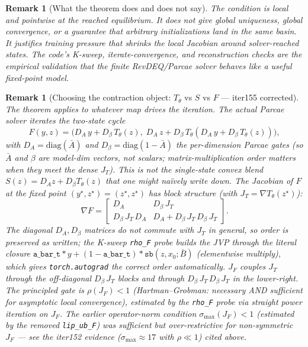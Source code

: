 \documentclass[11pt]{article}
\newtheorem{remark}[theorem]{Remark}
\begin{document}
\begin{remark}[What the theorem does and does not say]
The condition is local and pointwise at the reached equilibrium.  It does not
give global uniqueness, global convergence, or a guarantee that arbitrary
initializations land in the same basin.  It justifies training pressure that
shrinks the local Jacobian around solver-reached states.  The code's K-sweep,
iterate-convergence, and reconstruction checks are the empirical validation
that the finite RevDEQ/Parcae solver behaves like a useful fixed-point model.
\end{remark}

\begin{remark}[Choosing the contraction object: $T_\theta$ vs $S$ vs $F$ — iter155 corrected]
\label{rem:contraction-objects}
The theorem applies to whatever map drives the iteration.  The actual Parcae
solver iterates the two-state cycle
\[
  F(y, z) = \big(D_A\, y + D_\beta\, T_\theta(z),\;
                D_A\, z + D_\beta\, T_\theta(D_A\, y + D_\beta\, T_\theta(z))\big),
\]
with $D_A = \mathrm{diag}(\bar A)$ and $D_\beta = \mathrm{diag}(1-\bar A)$
the per-dimension Parcae gates (so $\bar A$ and $\beta$ are model-dim
vectors, not scalars; matrix-multiplication order matters when they meet
the dense $J_T$).  This is \emph{not} the single-state convex blend
$S(z) = D_A z + D_\beta T_\theta(z)$ that one might naïvely write down.
The Jacobian of $F$ at the fixed point $(y^\star, z^\star) = (z^\star, z^\star)$
has block structure (with $J_T = \nabla T_\theta(z^\star)$):
\[
  \nabla F =
  \begin{bmatrix}
    D_A & D_\beta\, J_T \\
    D_\beta\, J_T\, D_A & D_A + D_\beta\, J_T\, D_\beta\, J_T
  \end{bmatrix}.
\]
The diagonal $D_A, D_\beta$ matrices do \emph{not} commute with $J_T$ in
general, so order is preserved as written; the K-sweep \texttt{rho\_F}
probe builds the JVP through the literal closure
$\texttt{a\_bar\_t}*y + (1-\texttt{a\_bar\_t})*\texttt{sb}(z, x_0; \bar B)$
(elementwise multiply), which gives \texttt{torch.autograd} the correct
order automatically.  $J_F$ couples $J_T$ through the off-diagonal
$D_\beta\, J_T$ blocks and through $D_\beta\, J_T\, D_\beta\, J_T$ in the
lower-right.  The principled gate is $\rho(J_F)<1$ (Hartman--Grobman:
necessary AND sufficient for asymptotic local convergence), estimated by
the \texttt{rho\_F} probe via straight power iteration on $J_F$.  The
earlier operator-norm condition $\sigma_{\max}(J_F)<1$ (estimated by
the removed \texttt{lip\_ub\_F}) was \emph{sufficient but
over-restrictive} for non-symmetric $J_F$ — see the iter152 evidence
($\sigma_{\max}\approx 17$ with $\rho \ll 1$) cited above.


\end{remark}
\end{document}

